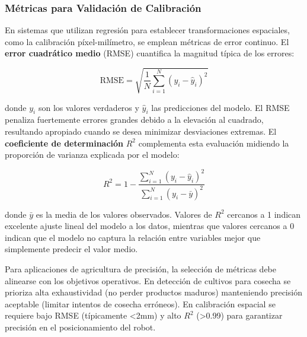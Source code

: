 \subsubsection{Métricas para Validación de Calibración}

En sistemas que utilizan regresión para establecer transformaciones espaciales, como la calibración píxel-milímetro, se emplean métricas de error continuo. El \textbf{error cuadrático medio} (RMSE) cuantifica la magnitud típica de los errores:

\begin{equation}
\text{RMSE} = \sqrt{\frac{1}{N}\sum_{i=1}^{N}(y_i - \hat{y}_i)^2}
\end{equation}

donde $y_i$ son los valores verdaderos y $\hat{y}_i$ las predicciones del modelo. El RMSE penaliza fuertemente errores grandes debido a la elevación al cuadrado, resultando apropiado cuando se desea minimizar desviaciones extremas. El \textbf{coeficiente de determinación} $R^2$ complementa esta evaluación midiendo la proporción de varianza explicada por el modelo:

\begin{equation}
R^2 = 1 - \frac{\sum_{i=1}^{N}(y_i - \hat{y}_i)^2}{\sum_{i=1}^{N}(y_i - \bar{y})^2}
\end{equation}

donde $\bar{y}$ es la media de los valores observados. Valores de $R^2$ cercanos a 1 indican excelente ajuste lineal del modelo a los datos, mientras que valores cercanos a 0 indican que el modelo no captura la relación entre variables mejor que simplemente predecir el valor medio.

Para aplicaciones de agricultura de precisión, la selección de métricas debe alinearse con los objetivos operativos. En detección de cultivos para cosecha se prioriza alta exhaustividad (no perder productos maduros) manteniendo precisión aceptable (limitar intentos de cosecha erróneos). En calibración espacial se requiere bajo RMSE (típicamente <2mm) y alto $R^2$ (>0.99) para garantizar precisión en el posicionamiento del robot.
